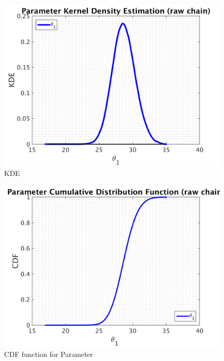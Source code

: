 \begin{figure}[H]
  
  \centering
   \includegraphics[scale=0.75]{53_results/output_20/simple_ip_kde_raw}
   \caption{ KDE }
\end{figure}

\begin{figure}[H]
  
  \centering
   \includegraphics[scale=0.75]{53_results/output_20/simple_ip_cdf_raw}
   \caption{CDF function for Parameter }
\end{figure}



